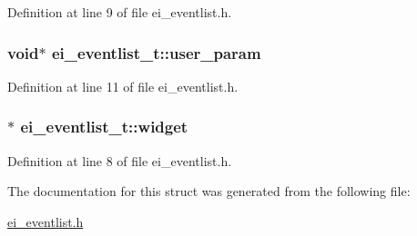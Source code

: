 Definition at line 9 of file ei\+\_\+eventlist.\+h.

\hypertarget{structei__eventlist__t_aa0a5cff6ec4391c1a2c24bfd02323479}{
\subsubsection[{user\+\_\+param}]{\setlength{\rightskip}{0pt plus 5cm}void$\ast$ ei\+\_\+eventlist\+\_\+t\+::user\+\_\+param}}\label{structei__eventlist__t_aa0a5cff6ec4391c1a2c24bfd02323479}


Definition at line 11 of file ei\+\_\+eventlist.\+h.

\hypertarget{structei__eventlist__t_a9842e40b69204e5456167184ca03770d}{
\subsubsection[{widget}]{$\ast$ ei\+\_\+eventlist\+\_\+t\+::widget}}\label{structei__eventlist__t_a9842e40b69204e5456167184ca03770d}


Definition at line 8 of file ei\+\_\+eventlist.\+h.



The documentation for this struct was generated from the following file\+:\begin{DoxyCompactItemize}
\item 
\hyperlink{ei__eventlist_8h}{ei\+\_\+eventlist.\+h}\end{DoxyCompactItemize}
